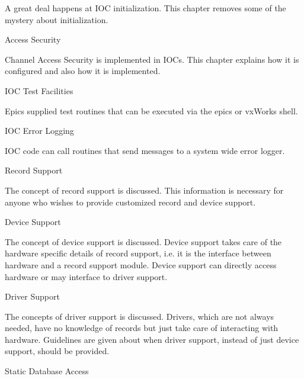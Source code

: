 \begin{description}\item A great deal happens at IOC initialization. This chapter removes some of the mystery about initialization.

\end{description}Access Security

\begin{description}\item Channel Access Security is implemented in IOCs. This chapter explains how it is configured and also how it is 
implemented.

\end{description}IOC Test Facilities

\begin{description}\item Epics supplied test routines that can be executed via the epics or vxWorks shell.

\end{description}IOC Error Logging

\begin{description}\item IOC code can call routines that send messages to a system wide error logger.

\end{description}Record Support

\begin{description}\item The concept of record support is discussed. This information is necessary for anyone who wishes to provide 
customized record and device support.

\end{description}Device Support

\begin{description}\item The concept of device support is discussed. Device support takes care of the hardware specific details of record 
support, i.e. it is the interface between hardware and a record support module. Device support can directly access 
hardware or may interface to driver support.

\end{description}Driver Support

\begin{description}\item The concepts of driver support is discussed. Drivers, which are not always needed, have no knowledge of records 
but just take care of interacting with hardware. Guidelines are given about when driver support, instead of just 
device support, should be provided.

\end{description}Static Database Access

